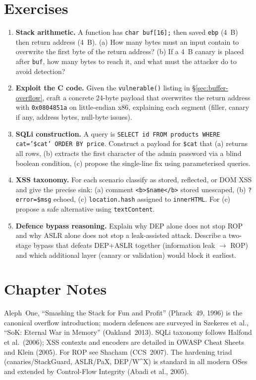 \section{Exercises}
\label{sec:ch05-exercises}
\begin{enumerate}[label=E5.\arabic*, leftmargin=*, itemsep=0.6em]
    \item \textbf{Stack arithmetic.} A function has \texttt{char buf[16];} then saved \texttt{ebp} (4~B) then return address (4~B). (a) How many bytes must an input contain to overwrite the first byte of the return address? (b) If a 4~B canary is placed after \texttt{buf}, how many bytes to reach it, and what must the attacker do to avoid detection?
    \item \textbf{Exploit the C code.} Given the \texttt{vulnerable()} listing in \S\ref{sec:buffer-overflow}, craft a concrete 24-byte payload that overwrites the return address with \texttt{0x0804851a} on little-endian x86, explaining each segment (filler, canary if any, address bytes, null-byte issues).
    \item \textbf{SQLi construction.} A query is \texttt{SELECT id FROM products WHERE cat='\$cat' ORDER BY price}. Construct a payload for \texttt{\$cat} that (a) returns all rows, (b) extracts the first character of the admin password via a blind boolean condition, (c) propose the single-line fix using parameterised queries.
    \item \textbf{XSS taxonomy.} For each scenario classify as stored, reflected, or DOM XSS and give the precise sink: (a) comment \texttt{<b>\$name</b>} stored unescaped, (b) \texttt{?error=\$msg} echoed, (c) \texttt{location.hash} assigned to \texttt{innerHTML}. For (c) propose a safe alternative using \texttt{textContent}.
    \item \textbf{Defence bypass reasoning.} Explain why DEP alone does not stop ROP and why ASLR alone does not stop a leak-assisted attack. Describe a two-stage bypass that defeats DEP+ASLR together (information leak $\to$ ROP) and which additional layer (canary or validation) would block it earliest.
\end{enumerate}

\section*{Chapter Notes}
Aleph~One, ``Smashing the Stack for Fun and Profit'' (Phrack~49, 1996) is the canonical overflow introduction; modern defences are surveyed in Szekeres et al., ``SoK: Eternal War in Memory'' (Oakland~2013). SQLi taxonomy follows Halfond et al.~(2006); XSS contexts and encoders are detailed in OWASP Cheat Sheets and Klein (2005). For ROP see Shacham (CCS~2007). The hardening triad (canaries/StackGuard, ASLR/PaX, DEP/W\^{}X) is standard in all modern OSes and extended by Control-Flow Integrity (Abadi et al., 2005).

